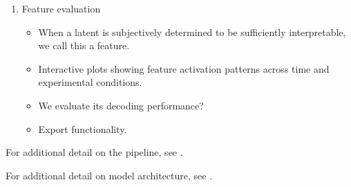 \begin{enumerate}
    \item Feature evaluation
    \begin{itemize}
        \item When a latent is subjectively determined to be sufficiently interpretable, we call this a feature.
        \item Interactive plots showing feature activation patterns across time and experimental conditions.
        \item We evaluate its decoding performance?
        \item Export functionality.
    \end{itemize}
\end{enumerate}

For additional detail on the pipeline, see .

For additional detail on model architecture, see .

